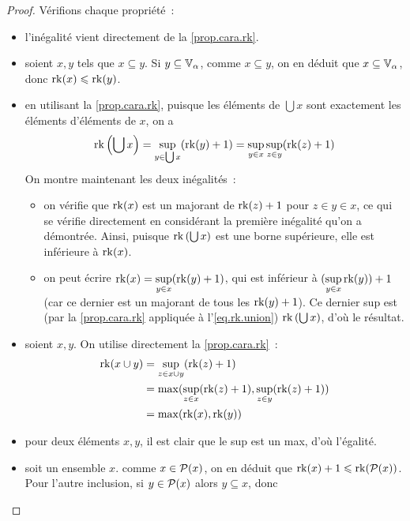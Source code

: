 \begin{proof}
  Vérifions chaque propriété~:
  \begin{itemize}
  \item l'inégalité vient directement de la \cref{prop.cara.rk}.
  \item soient $x,y$ tels que $x\subseteq y$. Si $y\subseteq\mathbb V_{\alpha}$, comme
    $x\subseteq y$, on en déduit que $x\subseteq\mathbb V_{\alpha}$, donc $\operatorname{rk}(x)\leqslant \operatorname{rk}(y)$.
  \item en utilisant la \cref{prop.cara.rk}, puisque les éléments de $\bigcup x$
    sont exactement les éléments d'éléments de $x$, on a
    \begin{equation}\label{eq.rk.union}
      \operatorname{rk}\left(\bigcup x\right) = \sup_{y \in \bigcup x} (\operatorname{rk}(y) + 1)
      = \sup_{y \in x}\sup_{z \in y}(\operatorname{rk}(z) + 1)
    \end{equation}
    On montre maintenant les deux inégalités~:
    \begin{itemize}
    \item on vérifie que $\operatorname{rk}(x)$ est un majorant de $\operatorname{rk}(z) + 1$ pour
      $z \in y \in x$, ce qui se vérifie directement en considérant la première
      inégalité qu'on a démontrée. Ainsi, puisque $\operatorname{rk}\left(\bigcup x\right)$
      est une borne supérieure, elle est inférieure à $\operatorname{rk}(x)$.
    \item on peut écrire $\displaystyle\operatorname{rk}(x) = \sup_{y \in x} (\operatorname{rk}(y) + 1)$, qui
      est inférieur à $\displaystyle(\sup_{y \in x} \operatorname{rk}(y)) + 1$ (car ce dernier
      est un majorant de tous les $\operatorname{rk}(y) + 1$). Ce dernier sup est
      (par la \cref{prop.cara.rk} appliquée à l'\cref{eq.rk.union})
      $\operatorname{rk}\left(\bigcup x\right)$, d'où le résultat.
    \end{itemize}
  \item soient $x,y$. On utilise directement la \cref{prop.cara.rk}~:
    \begin{align*}
      \operatorname{rk}(x\cup y) &= \sup_{z \in x \cup y} (\operatorname{rk}(z) + 1)\\
      &= \max(\sup_{z \in x} (\operatorname{rk}(z) + 1), \sup_{z\in y} (\operatorname{rk}(z) + 1))\\
      &= \max(\operatorname{rk}(x),\operatorname{rk}(y))
    \end{align*}
  \item pour deux éléments $x,y$, il est clair que le sup est un max, d'où
    l'égalité.
  \item soit un ensemble $x$. comme $x\in \mathcal{P}(x)$, on en déduit que
    $\operatorname{rk}(x) + 1 \leqslant \operatorname{rk} (\mathcal{P} (x))$. Pour l'autre inclusion, si
    $y\in \mathcal{P}(x)$ alors $y\subseteq x$, donc

\end{itemize}
\end{proof}
